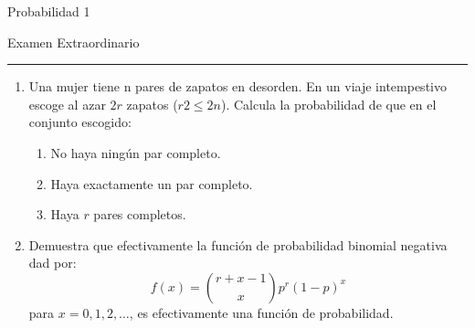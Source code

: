 \documentclass{report}
\begin{document}
\begin{center}
    \textsf{\Large Probabilidad 1}
    \par\medskip
    \textsf{\large Examen Extraordinario}
    \end{center}
    \hrule
    \par\bigskip

\begin{enumerate}
    \item Una mujer tiene n pares de zapatos en desorden. En un viaje intempestivo escoge al azar $2r$ zapatos ($r2\leq 2n$). Calcula la probabilidad de que en el conjunto escogido:
    \begin{enumerate}
        \item No haya ningún par completo.
        \item Haya exactamente un par completo.
        \item Haya $r$ pares completos.
    \end{enumerate}
    \item Demuestra que efectivamente la función de probabilidad binomial negativa dad por:
    $$
    f(x)= \binom{r+x-1}{x}p^r(1-p)^x
    $$
    para $x= 0,1,2,\ldots$, es efectivamente una función de probabilidad.

\end{enumerate}
\end{document}
